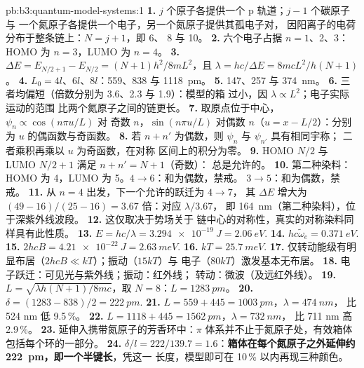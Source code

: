 \begin{solution}{pb:b3:quantum-model-systems:1}
\textbf{1.} $j$ 个原子各提供一个 p 轨道；$j - 1$ 个碳原子与
一个氮原子各提供一个电子，另一个氮原子提供其孤电子对，
因阳离子的电荷分布于整条链上：$N = j + 1$，即 6、
8 与 10。
\textbf{2.} 六个电子占据 $n = 1$、2、3：HOMO 为 $n = 3$，LUMO 为 $n = 4$。
\textbf{3.} $\Delta E = E_{N/2+1} - E_{N/2} = (N+1)h^2/8mL^2$，且 $\lambda =
hc/\Delta E = 8mcL^2/h(N+1)$。
\textbf{4.} $L_0 = 4l$、$6l$、$8l$：559、838 与 \qty{1118}{pm}。
\textbf{5.} 147、257 与 \qty{374}{nm}。
\textbf{6.} 三者均偏短（倍数分别为 3.6、2.3 与 1.9）：模型的箱
过小，因 $\lambda \propto L^2$；电子实际运动的范围
比两个氮原子之间的链更长。
\textbf{7.} 取原点位于中心，$\psi_n \propto \cos(n\pi u/L)$ 对
奇数 $n$，$\sin(n\pi u/L)$ 对偶数 $n$（$u = x - L/2$）：分别为
$u$ 的偶函数与奇函数。
\textbf{8.} 若 $n + n'$ 为偶数，则 $\psi_n$ 与 $\psi_{n'}$ 具有相同宇称；
二者乘积再乘以 $u$ 为奇函数，在对称
区间上的积分为零。
\textbf{9.} HOMO $N/2$ 与 LUMO $N/2 + 1$ 满足 $n + n' = N + 1$（奇数）：
总是允许的。
\textbf{10.} 第二种染料：HOMO 为 4，LUMO 为 5。$4 \to 6$：和为偶数，禁戒。
$3 \to 5$：和为偶数，禁戒。
\textbf{11.} 从 $n = 4$ 出发，下一个允许的跃迁为 $4 \to 7$，
其 $\Delta E$ 增大为 $(49 - 16)/(25 - 16) = 3.67$ 倍：对应 $\lambda/3.67$，
即 \qty{164}{nm}（第二种染料），位于深紫外线波段。
\textbf{12.} 这仅取决于势场关于
链中心的对称性，真实的对称染料同样具有此性质。
\textbf{13.} $E = hc/\lambda = \qty{3.294e-19}{J} = \qty{2.06}{eV}$.
\textbf{14.} $hc\tilde\omega_e = \qty{0.371}{eV}$.
\textbf{15.} $2hcB = \qty{4.21e-22}{J} = \qty{2.63}{meV}$.
\textbf{16.} $kT = \qty{25.7}{meV}$.
\textbf{17.} 仅转动能级有明显布居（$2hcB \ll kT$）；振动（$15kT$）与
电子（$80kT$）激发基本无布居。
\textbf{18.} 电子跃迁：可见光与紫外线；振动：红外线；
转动：微波（及远红外线）。
\textbf{19.} $L = \sqrt{\lambda h(N+1)/8mc}$，取 $N = 8$：$L = \qty{1283}{pm}$。
\textbf{20.} $\delta = (1283 - 838)/2 = \qty{222}{pm}$.
\textbf{21.} $L = 559 + 445 = \qty{1003}{pm}$，$\lambda = \qty{474}{nm}$，
比 524 nm 低 9.5\,\%。
\textbf{22.} $L = 1118 + 445 = \qty{1562}{pm}$，$\lambda = \qty{732}{nm}$，
比 711 nm 高 2.9\,\%。
\textbf{23.} 延伸入携带氮原子的芳香环中：$\pi$
体系并不止于氮原子处，有效箱体
包括每个环的一部分。
\textbf{24.} $\delta/l = 222/139.7 = 1.6$：\textbf{箱体在每个氮原子之外延伸约
\qty{222}{pm}，即一个半键长}，凭这一
长度，模型即可在 10\,\% 以内再现三种颜色。
\end{solution}

